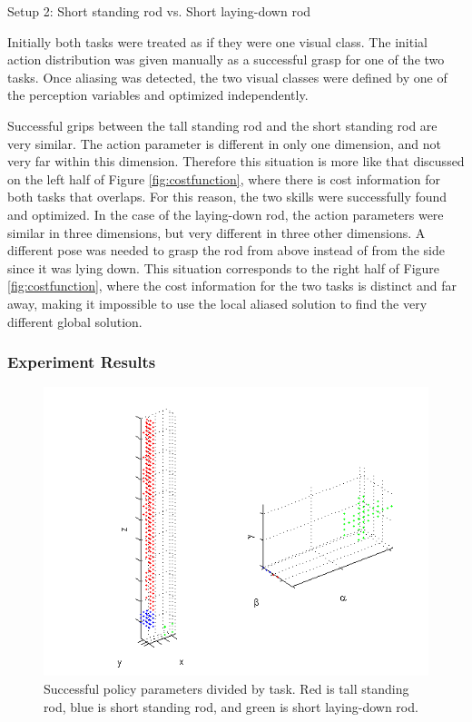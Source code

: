 \documentclass[12pt]{article}
\begin{document}
Setup 2:	Short standing rod	vs. 	Short laying-down rod

	Initially both tasks were treated as if they were one visual class. The initial action distribution was given manually as a successful grasp for one of the two tasks. Once aliasing was detected, the two visual classes were defined by one of the perception variables and optimized independently.
	
Successful grips between the tall standing rod and the short standing rod are very similar. The action parameter is different in only one dimension, and not very far within this dimension. Therefore this situation is more like that discussed on the left half of Figure \ref{fig:costfunction}, where there is cost information for both tasks that overlaps. For this reason, the two skills were successfully found and optimized. In the case of the laying-down rod, the action parameters were similar in three dimensions, but very different in three other dimensions. A different pose was needed to grasp the rod from above instead of from the side since it was lying down. This situation corresponds to the right half of Figure \ref{fig:costfunction}, where the cost information for the two tasks is distinct and far away, making it impossible to use the local aliased solution to find the very different global solution.

\subsubsection{Experiment Results}

\begin{figure}[ht]
  \centerline{
  \includegraphics[width=0.9\columnwidth]{6d.png}}
  \caption{\label{fig_6d} Successful policy parameters divided by task. Red is tall standing rod, blue is short standing rod, and green is short laying-down rod.}
  \label{fig:6d}
\end{figure}
\end{document}
